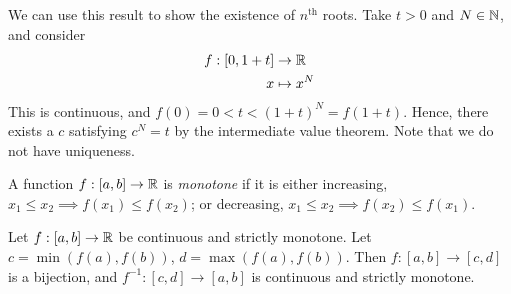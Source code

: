 \documentclass{../../template/note}
\begin{document}
    \begin{example*}
        We can use this result to show the existence of \(n^\text{th}\) roots. Take \(t > 0\) and \(N \in \mathbb N\), and consider
        \begin{align*}
            f: [0, 1 + t] &\to \mathbb R \\
            x &\mapsto x^N
        \end{align*}
        This is continuous, and \(f(0) = 0 < t < (1+t)^N = f(1+t)\). Hence, there exists a \(c\) satisfying \(c^N = t\) by the intermediate value theorem. Note that we do not have uniqueness.        
    \end{example*}
    
    \begin{definition}
        A function \(f: [a, b] \to \mathbb R\) is \emph{monotone} if it is either increasing, \(x_1 \leq x_2 \implies f(x_1) \leq f(x_2)\); or decreasing, \(x_1 \leq x_2 \implies f(x_2) \leq f(x_1)\).
    \end{definition}
    
    \begin{proposition}
        \label{ift-1}
        Let \(f: [a, b] \to \mathbb R\) be continuous and strictly monotone. Let \(c = \min(f(a), f(b))\), \(d = \max(f(a), f(b))\). Then \(f: [a, b] \to [c, d]\) is a bijection, and \(f^{-1}: [c, d] \to [a, b]\) is continuous and strictly monotone.
    \end{proposition}
\end{document}
